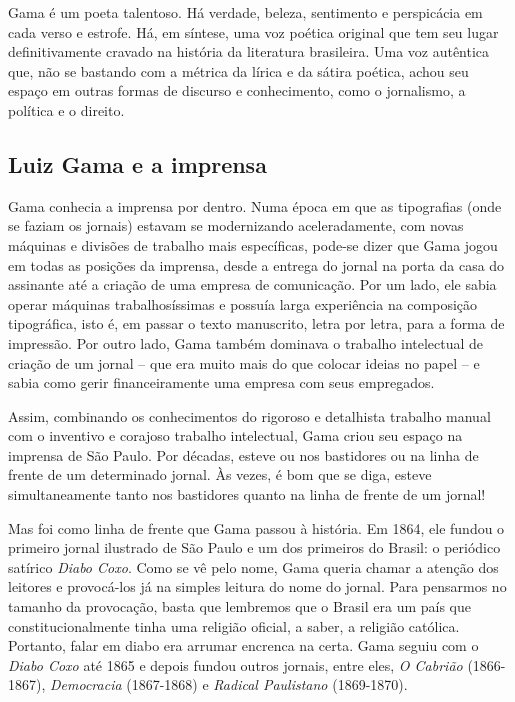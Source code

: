 Gama é um poeta talentoso. Há verdade, beleza, sentimento e perspicácia
em cada verso e estrofe. Há, em síntese, uma voz poética original que
tem seu lugar definitivamente cravado na história da literatura
brasileira. Uma voz autêntica que, não se bastando com a métrica da
lírica e da sátira poética, achou seu espaço em outras formas de
discurso e conhecimento, como o jornalismo, a política e o direito.

\subsection{Luiz Gama e a imprensa}

Gama conhecia a imprensa por dentro. Numa época em que as tipografias
(onde se faziam os jornais) estavam se modernizando aceleradamente, com
novas máquinas e divisões de trabalho mais específicas, pode-se dizer
que Gama jogou em todas as posições da imprensa, desde a entrega do
jornal na porta da casa do assinante até a criação de uma empresa de
comunicação. Por um lado, ele sabia operar máquinas trabalhosíssimas e
possuía larga experiência na composição tipográfica, isto é, em passar o
texto manuscrito, letra por letra, para a forma de impressão. Por outro
lado, Gama também dominava o trabalho intelectual de criação de um
jornal – que era muito mais do que colocar ideias no papel – e sabia
como gerir financeiramente uma empresa com seus empregados.

Assim, combinando os conhecimentos do rigoroso e detalhista trabalho
manual com o inventivo e corajoso trabalho intelectual, Gama criou seu
espaço na imprensa de São Paulo. Por décadas, esteve ou nos bastidores
ou na linha de frente de um determinado jornal. Às vezes, é bom que se
diga, esteve simultaneamente tanto nos bastidores quanto na linha de
frente de um jornal!

Mas foi como linha de frente que Gama passou à história. Em 1864, ele
fundou o primeiro jornal ilustrado de São Paulo e um dos primeiros do
Brasil: o periódico satírico \emph{Diabo Coxo}. Como se vê pelo nome,
Gama queria chamar a atenção dos leitores e provocá-los já na simples
leitura do nome do jornal. Para pensarmos no tamanho da provocação,
basta que lembremos que o Brasil era um país que constitucionalmente
tinha uma religião oficial, a saber, a religião católica. Portanto,
falar em diabo era arrumar encrenca na certa. Gama seguiu com o
\emph{Diabo Coxo} até 1865 e depois fundou outros jornais, entre eles,
\emph{O Cabrião} (1866-1867), \emph{Democracia} (1867-1868) e
\emph{Radical Paulistano} (1869-1870).

